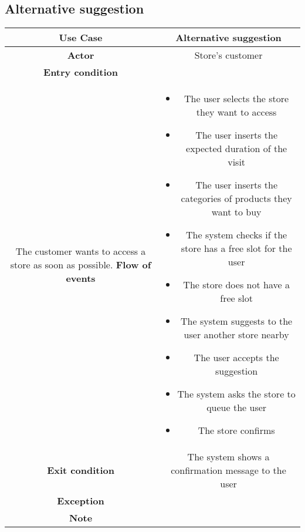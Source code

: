 \documentclass[../../main.tex]{subfiles}
\begin{document}
    \subsection*{Alternative suggestion}

    \begin{table}[]
        \begin{tabular}{cc}
        \hline
        \textbf{Use Case} & Alternative suggestion\\ \hline
        \textbf{Actor} & Store's customer\\ \hline
        \textbf{Entry condition} & \\ The customer wants to access a store as soon as possible.  \hline
        \textbf{Flow of events} & \begin{itemize}
                                    \item The user selects the store they want to access
                                    \item The user inserts the expected duration of the visit
                                    \item The user inserts the categories of products they want to buy
                                    \item The system checks if the store has a free slot for the user
                                    \item The store does not have a free slot
                                    \item The system suggests to the user another store nearby
                                    \item The user accepts the suggestion
                                    \item The system asks the store to queue the user
                                    \item The store confirms
                                  \end{itemize}\\ \hline
        \textbf{Exit condition} & The system shows a confirmation message to the user \\ \hline
        \textbf{Exception} & \\ \hline
        \textbf{Note} & \\ \hline
        \end{tabular}
        \end{table}
\end{document}
